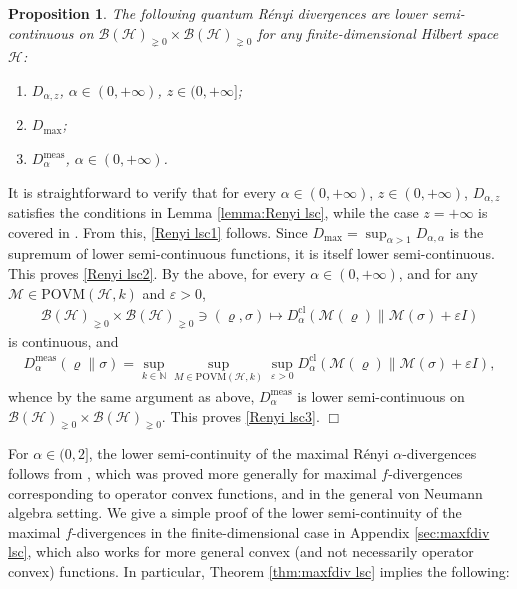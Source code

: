 \documentclass[unsortedaddress,superscriptaddress,pra,notitlepage]{revtex4}
\newtheorem{prop}[definition]{Proposition}
\newenvironment{proof}[1][Proof]{\begin{trivlist}
\item[\hskip \labelsep {\bfseries #1}]}{\hfill$\Box$\end{trivlist}}
\def\B{{\mathcal B}}
\def\M{\mathcal{M}}
\def\bN{\mathbb{N}}
\def\ep{\varepsilon}
\def\rho{\varrho}
\def\hil{{\mathcal H}}
\def\povm{\mathrm{POVM}}
\def\meas{\mathrm{meas}}
\def\pne{_{\gneq 0}}
\def\cl{\mathrm{cl}}
\def\cl{\mathrm{cl}}
\begin{document}
\begin{prop}\label{prop:lsc quantum Renyi}
The following quantum R\'enyi divergences are lower semi-continuous on 
$\B(\hil)\pne\times\B(\hil)\pne$ for any finite-dimensional Hilbert space $\hil$:
\begin{enumerate}
\item\label{Renyi lsc1}
$D_{\alpha,z}$, $\alpha\in(0,+\infty)$, $z\in(0,+\infty]$; 
\item\label{Renyi lsc2}
$D_{\max}$;
\item\label{Renyi lsc3}
$D_{\alpha}^{\meas}$, $\alpha\in(0,+\infty)$.
\end{enumerate}
\end{prop}
\begin{proof}
It is straightforward to verify that for every $\alpha\in(0,+\infty)$, $z\in(0,+\infty)$,
$D_{\alpha,z}$ satisfies the conditions in Lemma \ref{lemma:Renyi lsc}, 
while the case $z=+\infty$ is covered in \cite[Lemma 3.26]{MO-cqconv}.
From this,
\ref{Renyi lsc1} follows. Since $D_{\max}=\sup_{\alpha>1}D_{\alpha,\alpha}$ is the supremum of lower semi-continuous functions, it is itself lower semi-continuous.
This proves \ref{Renyi lsc2}.
By the above, for every $\alpha\in(0,+\infty)$, and 
for any $\M\in\povm(\hil,k)$ and $\ep>0$, 
\begin{align*}
\B(\hil)\pne\times\B(\hil)\pne\ni(\rho,\sigma)\mapsto
D_{\alpha}^{\cl}(\M(\rho)\|\M(\sigma)+\ep I)
\end{align*}
is continuous, and 
\begin{align*}
D_{\alpha}^{\meas}(\rho\|\sigma)=\sup_{k\in\bN}\sup_{M\in\povm(\hil,k)}\sup_{\ep>0}
D_{\alpha}^{\cl}(\M(\rho)\|\M(\sigma)+\ep I),
\end{align*}
whence by the same argument as above, $D_{\alpha}^{\meas}$ is lower semi-continuous on 
$\B(\hil)\pne\times\B(\hil)\pne$. This proves \ref{Renyi lsc3}.
\end{proof}

For $\alpha\in(0,2]$, the lower semi-continuity of the maximal R\'enyi $\alpha$-divergences 
follows from \cite[Theorem 5.5]{Hiai_maxfdiv}, which was proved 
more generally for maximal $f$-divergences corresponding to operator convex functions, and 
in 
the general von Neumann algebra setting. We give a simple proof of 
the lower semi-continuity of the maximal $f$-divergences in the finite-dimensional case 
in Appendix \ref{sec:maxfdiv lsc}, which also works for more general convex (and not necessarily operator convex) functions. 
In particular, Theorem \ref{thm:maxfdiv lsc} implies the following:
\end{document}
